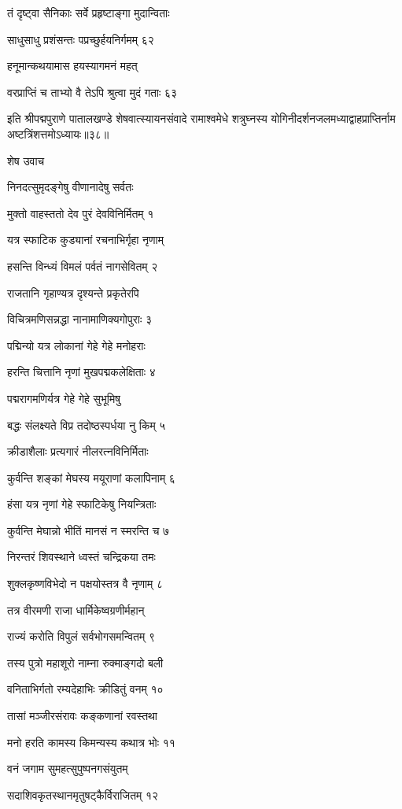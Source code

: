 तं दृष्ट्वा सैनिकाः सर्वे प्रहृष्टाङ्गा मुदान्विताः

साधुसाधु प्रशंसन्तः पप्रच्छुर्हयनिर्गमम् ६२

हनूमान्कथयामास हयस्यागमनं महत्

वरप्राप्तिं च ताभ्यो वै तेऽपि श्रुत्वा मुदं गताः ६३

इति श्रीपद्मपुराणे पातालखण्डे शेषवात्स्यायनसंवादे रामाश्वमेधे शत्रुघ्नस्य योगिनीदर्शनजलमध्याद्वाहप्राप्तिर्नाम अष्टत्रिंशत्तमोऽध्यायः॥३८॥


शेष उवाच

निनदत्सुमृदङ्गेषु वीणानादेषु सर्वतः

मुक्तो वाहस्ततो देव पुरं देवविनिर्मितम् १

यत्र स्फाटिक कुड्यानां रचनाभिर्गृहा नृणाम्

हसन्ति विन्ध्यं विमलं पर्वतं नागसेवितम् २

राजतानि गृहाण्यत्र दृश्यन्ते प्रकृतेरपि

विचित्रमणिसन्नद्धा नानामाणिक्यगोपुराः ३

पद्मिन्यो यत्र लोकानां गेहे गेहे मनोहराः

हरन्ति चित्तानि नृणां मुखपद्मकलेक्षिताः ४

पद्मरागमणिर्यत्र गेहे गेहे सुभूमिषु

बद्धः संलक्ष्यते विप्र तदोष्ठस्पर्धया नु किम् ५

क्रीडाशैलाः प्रत्यगारं नीलरत्नविनिर्मिताः

कुर्वन्ति शङ्कां मेघस्य मयूराणां कलापिनाम् ६

हंसा यत्र नृणां गेहे स्फाटिकेषु नियन्त्रिताः

कुर्वन्ति मेघान्नो भीतिं मानसं न स्मरन्ति च ७

निरन्तरं शिवस्थाने ध्वस्तं चन्द्रिकया तमः

शुक्लकृष्णविभेदो न पक्षयोस्तत्र वै नृणाम् ८

तत्र वीरमणी राजा धार्मिकेष्वग्रणीर्महान्

राज्यं करोति विपुलं सर्वभोगसमन्वितम् ९

तस्य पुत्रो महाशूरो नाम्ना रुक्माङ्गदो बली

वनिताभिर्गतो रम्यदेहाभिः क्रीडितुं वनम् १०

तासां मञ्जीरसंरावः कङ्कणानां रवस्तथा

मनो हरति कामस्य किमन्यस्य कथात्र भोः ११

वनं जगाम सुमहत्सुपुष्पनगसंयुतम्

सदाशिवकृतस्थानमृतुषट्कैर्विराजितम् १२

